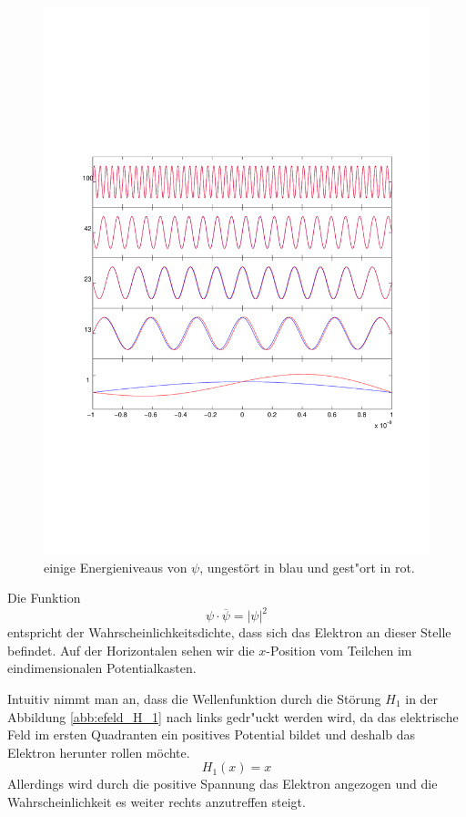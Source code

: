 \begin{refsection}
\begin{figure}
 \centering
 \includegraphics[width=12cm,clip=true,trim=2cm 6.6cm 1cm 8cm]{efeld/Psi_SubPlots_gestoert.pdf}
 \caption{einige Energieniveaus von $\psi$, ungest\"ort in blau und gest"ort in rot.}
 \label{abb:efeld_psi_gestoert}
\end{figure}

Die Funktion 
\[
  \psi \cdot \overline{\psi} = |\psi|^2
\]
entspricht der Wahrscheinlichkeitsdichte, 
dass sich das Elektron an dieser Stelle befindet.
Auf der Horizontalen sehen wir die $x$-Position vom Teilchen im eindimensionalen Potentialkasten.

Intuitiv nimmt man an, dass die Wellenfunktion durch die St\"orung $H_1$ in der Abbildung 
\ref{abb:efeld_H_1} nach links gedr"uckt werden wird, da das elektrische Feld 
im ersten Quadranten ein positives Potential bildet und deshalb das Elektron herunter rollen m\"ochte.
\[
  H_1(x) = x
\]
Allerdings wird durch die positive Spannung das Elektron angezogen und die
Wahrscheinlichkeit es weiter rechts anzutreffen steigt.


\end{refsection}
